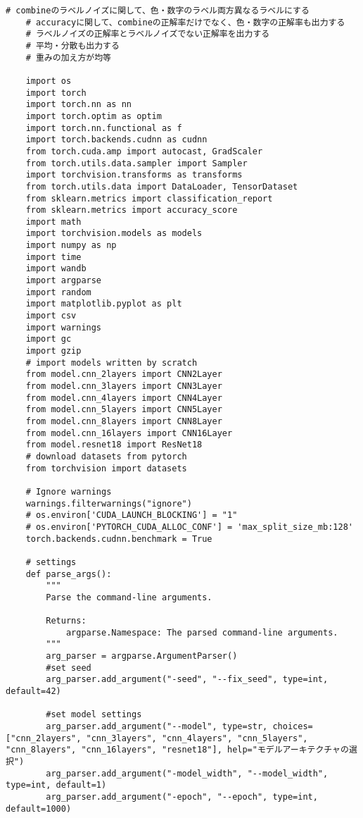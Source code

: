 \begin{lstlisting}[style=pythonstyle, caption={Program Example}]
    # combineのラベルノイズに関して、色・数字のラベル両方異なるラベルにする
    # accuracyに関して、combineの正解率だけでなく、色・数字の正解率も出力する
    # ラベルノイズの正解率とラベルノイズでない正解率を出力する
    # 平均・分散も出力する
    # 重みの加え方が均等
    
    import os
    import torch
    import torch.nn as nn
    import torch.optim as optim
    import torch.nn.functional as f
    import torch.backends.cudnn as cudnn
    from torch.cuda.amp import autocast, GradScaler
    from torch.utils.data.sampler import Sampler
    import torchvision.transforms as transforms
    from torch.utils.data import DataLoader, TensorDataset
    from sklearn.metrics import classification_report
    from sklearn.metrics import accuracy_score
    import math
    import torchvision.models as models
    import numpy as np
    import time
    import wandb
    import argparse
    import random
    import matplotlib.pyplot as plt
    import csv 
    import warnings
    import gc
    import gzip
    # import models written by scratch
    from model.cnn_2layers import CNN2Layer
    from model.cnn_3layers import CNN3Layer
    from model.cnn_4layers import CNN4Layer
    from model.cnn_5layers import CNN5Layer
    from model.cnn_8layers import CNN8Layer
    from model.cnn_16layers import CNN16Layer
    from model.resnet18 import ResNet18
    # download datasets from pytorch
    from torchvision import datasets
    
    # Ignore warnings
    warnings.filterwarnings("ignore")
    # os.environ['CUDA_LAUNCH_BLOCKING'] = "1"
    # os.environ['PYTORCH_CUDA_ALLOC_CONF'] = 'max_split_size_mb:128'
    torch.backends.cudnn.benchmark = True
    
    # settings
    def parse_args():
        """
        Parse the command-line arguments.
        
        Returns:
            argparse.Namespace: The parsed command-line arguments.
        """
        arg_parser = argparse.ArgumentParser()
        #set seed
        arg_parser.add_argument("-seed", "--fix_seed", type=int, default=42)
        
        #set model settings
        arg_parser.add_argument("--model", type=str, choices=["cnn_2layers", "cnn_3layers", "cnn_4layers", "cnn_5layers", "cnn_8layers", "cnn_16layers", "resnet18"], help="モデルアーキテクチャの選択")
        arg_parser.add_argument("-model_width", "--model_width", type=int, default=1)
        arg_parser.add_argument("-epoch", "--epoch", type=int, default=1000)
        

\end{lstlisting}

